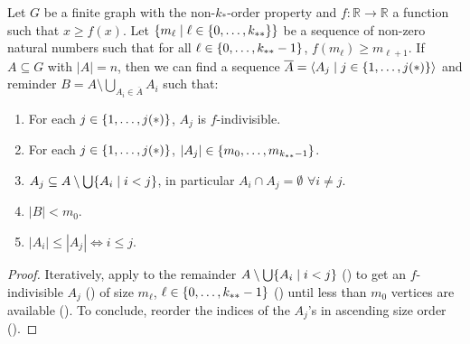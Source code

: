         \begin{lemma} \label{lem:existance_of_ordered_f_indivisible_partitions}
            Let $G$ be a finite graph with the non-$k_{*}$-order property and $f: \mathbb{R} \longrightarrow \mathbb{R}$ a function
            such that $x \geq f(x)$.
            Let $\{ m_\ell \mid \ell \in \{ 0, \dots, k_{**} \} \}$ be a sequence of non-zero natural numbers such that
            for all $\ell \in \{ 0, \dots, k_{**}-1 \}$, $f(m_{\ell}) \geq m_{\ell+1}$.
            If $A \subseteq G$ with $|A| = n$, then we can find a sequence $\overline{A} = \left< A_j \mid j \in \{ 1, \dots, j(*) \} \right>$
            and reminder $B = A \setminus \bigcup_{A_i \in \overline{A}} A_i$ such that:
            \begin{enumerate}[label={\Roman*}., ref={\Roman*}, font=\rmfamily]
                \item \label{itm:existance_of_ordered_f_indivisible_partitions.1} For each $j \in \{ 1, \dots, j(*) \}$, $A_j$ is $f$-indivisible.
                \item \label{itm:existance_of_ordered_f_indivisible_partitions.2} For each $j \in \{ 1, \dots, j(*) \}$, $|A_j| \in \{ m_0, \dots, m_{k_{**}-1} \}$.
                \item \label{itm:existance_of_ordered_f_indivisible_partitions.3} $A_j \subseteq A \setminus \bigcup\{ A_i \mid i < j \}$, in particular $A_i \cap A_j = \emptyset$ $\forall i \neq j$.
                \item \label{itm:existance_of_ordered_f_indivisible_partitions.4} $|B| < m_0$.
                \item \label{itm:existance_of_ordered_f_indivisible_partitions.5} $|A_i| \leq |A_j| \Leftrightarrow i \leq j$.
            \end{enumerate}
            \begin{proof}
                Iteratively, apply  to the remainder $A \setminus \bigcup \{ A_i \mid i < j \}$
                () to get an $f$-indivisible $A_j$ () of size $m_\ell$, $\ell \in \{ 0, \dots, k_{**}-1 \}$
                () until less than $m_0$ vertices are available ().
                To conclude, reorder the indices of the $A_j$'s in ascending size order ().
            \end{proof}
        \end{lemma}

